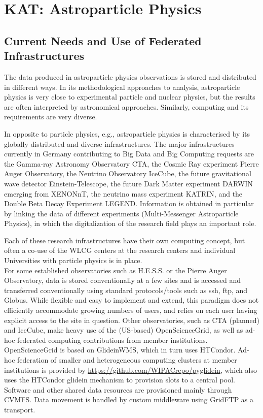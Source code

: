 \section{KAT: Astroparticle Physics} 


\subsection{Current Needs and Use of Federated Infrastructures}

The data produced in astroparticle physics observations is stored and 
distributed in different ways. 
In its methodological approaches to analysis, astroparticle physics is very close to experimental particle and nuclear physics, but the results are often interpreted by astronomical approaches. Similarly, computing and its requirements are very diverse. 

In opposite to particle physics, e.g., astroparticle physics is
characterised by its globally distributed and diverse infrastructures. 
The major infrastructures currently in Germany contributing to Big Data and Big Computing requests are the Gamma-ray Astronomy
Observatory CTA, the Cosmic Ray experiment Pierre Auger Observatory,
the Neutrino Observatory IceCube, the future gravitational wave detector Einstein-Telescope, the future Dark Matter experiment DARWIN emerging from XENONnT, the neutrino mass experiment KATRIN, and the Double Beta Decay
Experiment LEGEND. 
Information is obtained in particular by linking the
data of different experiments (Multi-Messenger Astroparticle Physics), in
which the digitalization of the research field plays an important role. 

Each of these research infrastructures have their own computing concept, but often a co-use of the WLCG centers at the research centers and individual Universities with particle physics is in place.  \\

 
For some established observatories such as H.E.S.S. or the Pierre Auger Observatory, data is stored conventionally at a few sites and is accessed and transferred conventionally using standard protocols/tools such as ssh, ftp, and Globus. 
While flexible and easy to implement and extend,
this paradigm does not efficiently accommodate growing numbers of users,
and relies on each user having explicit access to the site in question. 
Other observatories, such as CTA (planned) and IceCube, make heavy use of the (US-based) OpenScienceGrid, as well as ad-hoc federated computing contributions from member institutions. 
OpenScienceGrid is based on GlideinWMS, which in turn uses HTCondor. 
Ad-hoc federation of smaller and heterogeneous computing clusters at member institutions is provided by \url{https://github.com/WIPACrepo/pyglidein}, which also uses the HTCondor glidein mechanism to provision slots to a central pool.
Software and other shared data resources are provisioned mainly through
CVMFS. Data movement is handled by custom middleware using GridFTP as a transport. \\

